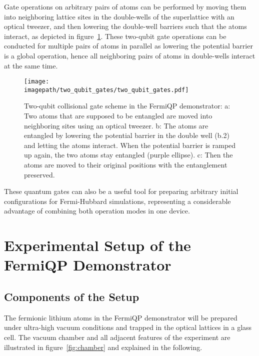 Gate operations on arbitrary pairs of atoms can be performed by moving them into neighboring lattice sites in the double-wells of the superlattice with an optical tweezer, and then lowering the double-well barriers such that the atoms interact, as depicted in figure~\ref{fig:two_qubit_gates}. These two-qubit gate operations can be conducted for multiple pairs of atoms in parallel as lowering the potential barrier is a global operation, hence all neighboring pairs of atoms in double-wells interact at the same time.

\begin{figure}
    \centering
    \texttt{[image: \\imagepath/two\_qubit\_gates/two\_qubit\_gates.pdf]}
    \caption{Two-qubit collisional gate scheme in the FermiQP demonstrator: a: Two atoms that are supposed to be entangled are moved into neighboring sites using an optical tweezer. b: The atoms are entangled by lowering the potential barrier in the double well (b.2) and letting the atoms interact. When the potential barrier is ramped up again, the two atoms stay entangled (purple ellipse). c: Then the atoms are moved to their original positions with the entanglement preserved.}
    \label{fig:two_qubit_gates}
\end{figure}

These quantum gates can also be a useful tool for preparing arbitrary initial configurations for Fermi-Hubbard simulations, representing a considerable advantage of combining both operation modes in one device.



\section{Experimental Setup of the FermiQP Demonstrator}

\subsection*{Components of the Setup}
The fermionic lithium atoms in the FermiQP demonstrator will be prepared under ultra-high vacuum conditions and trapped in the optical lattices in a glass cell. The vacuum chamber and all adjacent features of the experiment are illustrated in figure~\ref{fig:chamber} and explained in the following.

